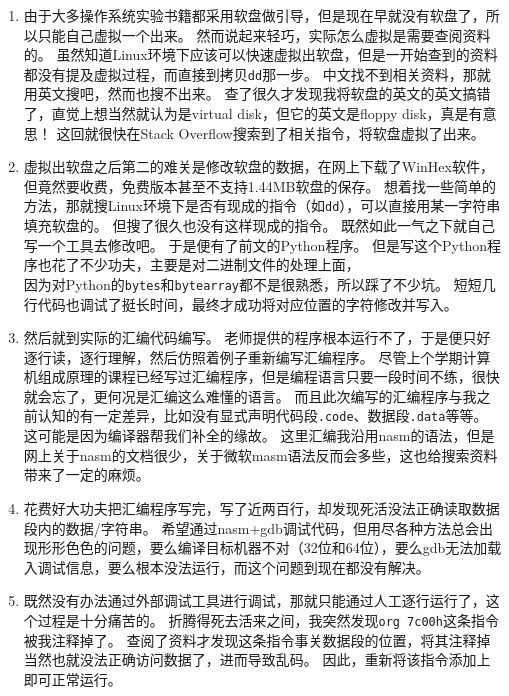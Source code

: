 \documentclass[logo,reportComp]{thesis}
\begin{document}
\begin{enumerate}
\item 由于大多操作系统实验书籍都采用软盘做引导，但是现在早就没有软盘了，所以只能自己虚拟一个出来。
然而说起来轻巧，实际怎么虚拟是需要查阅资料的。
虽然知道Linux环境下应该可以快速虚拟出软盘，但是一开始查到的资料都没有提及虚拟过程，而直接到拷贝\verb'dd'那一步。
中文找不到相关资料，那就用英文搜吧，然而也搜不出来。
查了很久才发现我将软盘的英文的英文搞错了，直觉上想当然就认为是virtual disk，但它的英文是floppy disk，真是有意思！
这回就很快在Stack Overflow搜索到了相关指令，将软盘虚拟了出来。

\item 虚拟出软盘之后第二的难关是修改软盘的数据，在网上下载了WinHex软件，但竟然要收费，免费版本甚至不支持1.44MB软盘的保存。
想着找一些简单的方法，那就搜Linux环境下是否有现成的指令（如\verb'dd'），可以直接用某一字符串填充软盘的。
但搜了很久也没有这样现成的指令。
既然如此一气之下就自己写一个工具去修改吧。
于是便有了前文的Python程序。
但是写这个Python程序也花了不少功夫，主要是对二进制文件的处理上面，\\因为对Python的\verb'bytes'和\verb'bytearray'都不是很熟悉，所以踩了不少坑。
短短几行代码也调试了挺长时间，最终才成功将对应位置的字符修改并写入。

\item 然后就到实际的汇编代码编写。
老师提供的程序根本运行不了，于是便只好逐行读，逐行理解，然后仿照着例子重新编写汇编程序。
尽管上个学期计算机组成原理的课程已经写过汇编程序，但是编程语言只要一段时间不练，很快就会忘了，更何况是汇编这么难懂的语言。
而且此次编写的汇编程序与我之前认知的有一定差异，比如没有显式声明代码段\verb'.code'、数据段\verb'.data'等等。
这可能是因为编译器帮我们补全的缘故。
这里汇编我沿用nasm的语法，但是网上关于nasm的文档很少，关于微软masm语法反而会多些，这也给搜索资料带来了一定的麻烦。

\item 花费好大功夫把汇编程序写完，写了近两百行，却发现死活没法正确读取数据段内的数据/字符串。
希望通过nasm+gdb调试代码，但用尽各种方法总会出现形形色色的问题，要么编译目标机器不对（32位和64位），要么gdb无法加载入调试信息，要么根本没法运行，而这个问题到现在都没有解决。

\item 既然没有办法通过外部调试工具进行调试，那就只能通过人工逐行运行了，这个过程是十分痛苦的。
折腾得死去活来之间，我突然发现\verb'org 7c00h'这条指令被我注释掉了。
查阅了资料才发现这条指令事关数据段的位置，将其注释掉当然也就没法正确访问数据了，进而导致乱码。
因此，重新将该指令添加上即可正常运行。


\end{enumerate}
\end{document}
